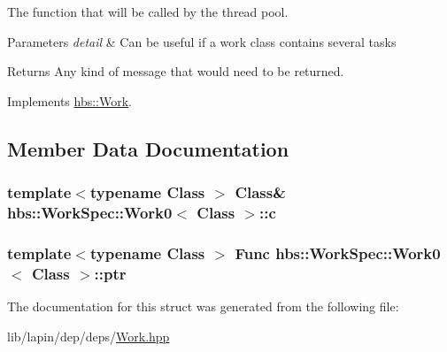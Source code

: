 The function that will be called by the thread pool. 


\begin{DoxyParams}{Parameters}
{\em detail} & Can be useful if a work class contains several tasks \\
\hline
\end{DoxyParams}
\begin{DoxyReturn}{Returns}
Any kind of message that would need to be returned. 
\end{DoxyReturn}


Implements \hyperlink{classhbs_1_1_work_a22b695d863b04ef8a15adb4b2a981c6d}{hbs\-::\-Work}.



\subsection{Member Data Documentation}
\hypertarget{structhbs_1_1_work_spec_1_1_work0_a62e5d34572e07faeb1797c372416845c}{
\subsubsection[{c}]{\setlength{\rightskip}{0pt plus 5cm}template$<$typename Class $>$ Class\& {\bf hbs\-::\-Work\-Spec\-::\-Work0}$<$ Class $>$\-::c}}\label{structhbs_1_1_work_spec_1_1_work0_a62e5d34572e07faeb1797c372416845c}
\hypertarget{structhbs_1_1_work_spec_1_1_work0_a99e7551bb790b3f9f661732abc77c582}{
\subsubsection[{ptr}]{\setlength{\rightskip}{0pt plus 5cm}template$<$typename Class $>$ {\bf Func} {\bf hbs\-::\-Work\-Spec\-::\-Work0}$<$ Class $>$\-::ptr}}\label{structhbs_1_1_work_spec_1_1_work0_a99e7551bb790b3f9f661732abc77c582}


The documentation for this struct was generated from the following file\-:\begin{DoxyCompactItemize}
\item 
lib/lapin/dep/deps/\hyperlink{_work_8hpp}{Work.\-hpp}\end{DoxyCompactItemize}
